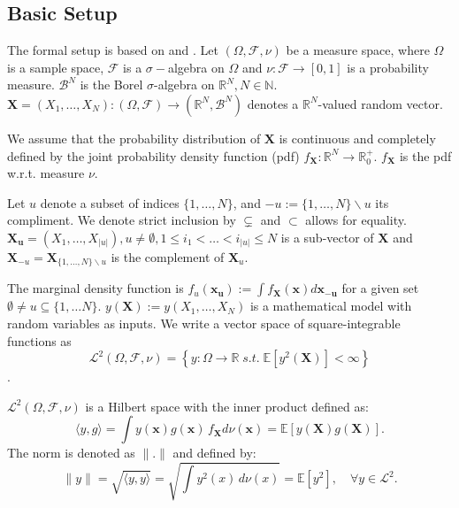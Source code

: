 \subsection*{Basic Setup}
The formal setup is based on \cite{chastaing2012} and \cite{rahman2014}. Let $(\Omega, \mathcal{F}, \nu)$ be a measure space, where $\Omega$ is a sample space, $\mathcal{F}$ is a $\sigma-$algebra on $\Omega$ and $\nu: \mathcal{F} \rightarrow [0, 1]$ is a probability measure. $\mathcal{B}^N$ is the Borel $\sigma$-algebra on $\mathbb{R}^N, N \in \mathbb{N}$.
$\boldsymbol{X} = (X_1, \dots, X_N): (\Omega, \mathcal{F}) \rightarrow (\mathbb{R}^N, \mathcal{B}^N)$ denotes a $\mathbb{R}^N$-valued random vector.\par
We assume that the probability distribution of $\boldsymbol{X}$ is continuous and completely defined by the joint probability density function (pdf) $f_{\boldsymbol{X}}: \mathbb{R}^N \rightarrow \mathbb{R}_{0}^+$. $f_{\boldsymbol{X}}$ is the pdf w.r.t. measure $\nu$. \par

Let $u$ denote a subset of indices $\{1, \dots, N\}$, and $-u := \{1, \dots, N\} \backslash{} u$ its compliment. We denote strict inclusion by $\subsetneq$ and $\subset$ allows for equality.
$\boldsymbol{X_u} = (X_1, \dots, X_{|u|}), u \neq \emptyset, 1 \leq i_1 < \dots < i_{|u|} \leq N$ is a sub-vector of $\boldsymbol{X}$ and $\boldsymbol{X}_{-u} = \boldsymbol{X}_{\{1, \dots, N\} \backslash{} u}$ is the complement of $\boldsymbol{X}_u$.\par

The marginal density function is $f_u(\boldsymbol{x_u}) := \int f_{\boldsymbol{X}}(\boldsymbol{x})d\boldsymbol{x_{-u}}$ for a given set $\emptyset \neq u \subseteq \{1, \dots N\}$.
$y(\boldsymbol{X}) := y(X_1, \dots, X_N)$ is a mathematical model with random variables as inputs.
We write a vector space of square-integrable functions as
\[\mathcal{L}^2(\Omega, \mathcal{F}, \nu) = \left\{ y: \Omega \rightarrow \mathbb{R} \; \textit{s.t.} \; \mathbb{E}[y^2(\boldsymbol{X})] < \infty \right\}\].

$\mathcal{L}^2(\Omega, \mathcal{F}, \nu)$ is a Hilbert space with the inner product defined as:
\[
\langle y, g \rangle = \int y(\boldsymbol{x}) g(\boldsymbol{x}) \, f_{\boldsymbol{X}}d\nu(\boldsymbol{x}) = \mathbb{E}[y(\boldsymbol{X})g(\boldsymbol{X})].
\]
The norm is denoted as $\|.\| $ and defined by:
\[
\|y\| = \sqrt{\langle y, y \rangle} = \sqrt{\int y^2(x) \, d\nu(x)} = \mathbb{E}[y^2], \quad \forall y \in \mathcal{L}^2.
\]

